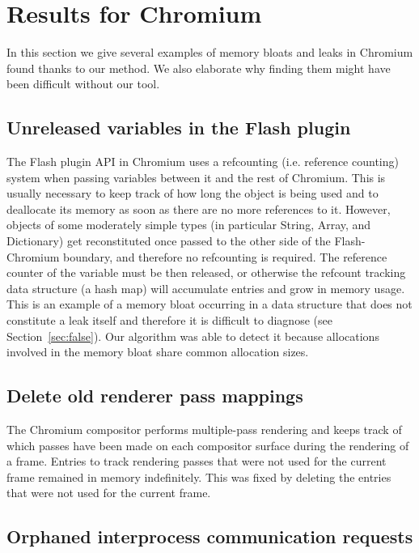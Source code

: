 \documentclass[preprint, numbers]{sigplanconf}
\newcommand{\todo}[1]{{\color{red}{(TODO: #1)}}}
\begin{document}
\section{Results for Chromium}
\label{sec:results}

In this section we give several examples of memory bloats and leaks in Chromium found
thanks to our method.
We also elaborate why finding them might have been difficult without our tool.

\subsection{Unreleased variables in the Flash plugin \cite{cr-flash}}

The Flash plugin API in Chromium uses a refcounting (i.e. reference counting) system when passing variables between it and the rest of Chromium.
This is usually necessary to keep track of how long the object is being used and
to deallocate its memory as soon as there are no more references to it.
However, objects of some moderately simple types (in particular String, Array, and Dictionary)
get reconstituted once passed to the other side of the Flash-Chromium boundary, and therefore no refcounting is required.
The reference counter of the variable must be then released, or otherwise the refcount tracking data structure (a hash map) will accumulate entries and grow in memory usage.
This is an example of a memory bloat occurring in a data structure
that does not constitute a leak itself and therefore it is difficult to diagnose (see Section~\ref{sec:false}).
Our algorithm was able to detect it because allocations involved in the memory bloat share common allocation sizes.

\subsection{Delete old renderer pass mappings \cite{cr-mappings}}

\todo{Rewrite} The Chromium compositor performs multiple-pass rendering and keeps track of which passes have been
made on each compositor surface during the rendering of a frame.
Entries to track rendering passes that were not used for the current frame
remained in memory indefinitely.
This was fixed by deleting the entries that were not used for the current frame.

\subsection{Orphaned interprocess communication requests \cite{cr-orphaned}}
\end{document}
